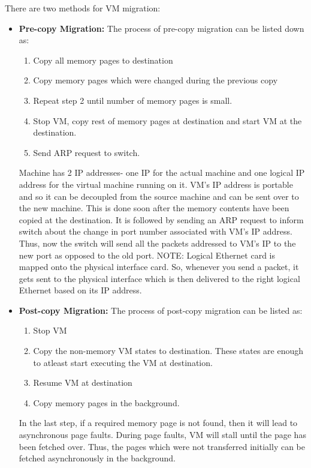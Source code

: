 \documentclass[twoside]{article}
\begin{document}
There are two methods for VM migration:
\begin{itemize}
    \item \textbf{Pre-copy Migration:} The process of pre-copy migration can be listed down as:
    \begin{enumerate}
        \item Copy all memory pages to destination
        \item Copy memory pages which were changed during the previous copy
        \item Repeat step 2 until number of memory pages is small.
        \item Stop VM, copy rest of memory pages at destination and start VM at the destination.
        \item Send ARP request to switch.
    \end{enumerate}
    Machine has 2 IP addresses- one IP for the actual machine and one logical IP address for the virtual machine running on it. VM's IP address is portable and so it can be decoupled from the source machine and can be sent over to the new machine. This is done soon after the memory contents have been copied at the destination. It is followed by sending an ARP request to inform switch about the change in port number associated with VM's IP address. Thus, now the switch will send all the packets addressed to VM's IP to the new port as opposed to the old port. NOTE: Logical Ethernet card is mapped onto the physical interface card. So, whenever you send a packet, it gets sent to the physical interface which is then delivered to the right logical Ethernet based on its IP address. 

    \item \textbf{Post-copy Migration:} The process of post-copy migration can be listed as:
    \begin{enumerate}
        \item Stop VM 
        \item Copy the non-memory VM states to destination. These states are enough to atleast start executing the VM at destination.
        \item Resume VM at destination
        \item Copy memory pages in the background. 
    \end{enumerate}
    In the last step, if a required memory page is not found, then it will lead to asynchronous page faults. During page faults, VM will stall until the page has been fetched over. Thus, the pages which were not transferred initially can be fetched asynchronously in the background.
\end{itemize}
\end{document}
